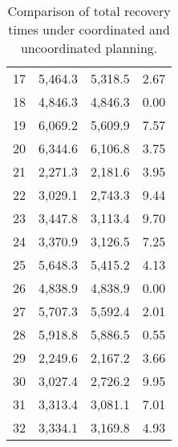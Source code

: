 \documentclass[11pt]{article}
\begin{document}
\begin{table}[H]
\begin{tabular}{@{}cccr@{}}
\multicolumn{1}{c|}{17} & \multicolumn{1}{c|}{5,464.3} & \multicolumn{1}{c|}{5,318.5} & 2.67 \\
\multicolumn{1}{c|}{18} & \multicolumn{1}{c|}{4,846.3} & \multicolumn{1}{c|}{4,846.3} & 0.00 \\
\multicolumn{1}{c|}{19} & \multicolumn{1}{c|}{6,069.2} & \multicolumn{1}{c|}{5,609.9} & 7.57 \\
\multicolumn{1}{c|}{20} & \multicolumn{1}{c|}{6,344.6} & \multicolumn{1}{c|}{6,106.8} & 3.75 \\
\multicolumn{1}{c|}{21} & \multicolumn{1}{c|}{2,271.3} & \multicolumn{1}{c|}{2,181.6} & 3.95 \\
\multicolumn{1}{c|}{22} & \multicolumn{1}{c|}{3,029.1} & \multicolumn{1}{c|}{2,743.3} & 9.44 \\
\multicolumn{1}{c|}{23} & \multicolumn{1}{c|}{3,447.8} & \multicolumn{1}{c|}{3,113.4} & 9.70 \\
\multicolumn{1}{c|}{24} & \multicolumn{1}{c|}{3,370.9} & \multicolumn{1}{c|}{3,126.5} & 7.25 \\
\multicolumn{1}{c|}{25} & \multicolumn{1}{c|}{5,648.3} & \multicolumn{1}{c|}{5,415.2} & 4.13 \\
\multicolumn{1}{c|}{26} & \multicolumn{1}{c|}{4,838.9} & \multicolumn{1}{c|}{4,838.9} & 0.00 \\
\multicolumn{1}{c|}{27} & \multicolumn{1}{c|}{5,707.3} & \multicolumn{1}{c|}{5,592.4} & 2.01 \\
\multicolumn{1}{c|}{28} & \multicolumn{1}{c|}{5,918.8} & \multicolumn{1}{c|}{5,886.5} & 0.55 \\
\multicolumn{1}{c|}{29} & \multicolumn{1}{c|}{2,249.6} & \multicolumn{1}{c|}{2,167.2} & 3.66 \\
\multicolumn{1}{c|}{30} & \multicolumn{1}{c|}{3,027.4} & \multicolumn{1}{c|}{2,726.2} & 9.95 \\
\multicolumn{1}{c|}{31} & \multicolumn{1}{c|}{3,313.4} & \multicolumn{1}{c|}{3,081.1} & 7.01 \\
\multicolumn{1}{c|}{32} & \multicolumn{1}{c|}{3,334.1} & \multicolumn{1}{c|}{3,169.8} & 4.93 \\ \bottomrule
\end{tabular}
    \caption{Comparison of total recovery times under coordinated and uncoordinated planning.}
    \label{coord_vs_uncoord}%
\end{table}
\end{document}
